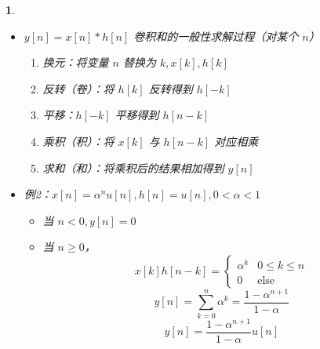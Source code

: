 \documentclass[UTF8]{report}
\theoremstyle{MyLineTheoremStyle} %
\theoremstyle{MyBlockTheoremStyle} %
\theoremstyle{MySubsubsectionStyle} %
\newtheorem{definition}{}
\begin{document}
\begin{definition}
\begin{itemize}
        \item $y[n] = x[n] * h[n]$ 卷积和的一般性求解过程（对某个 $n$）
        \begin{enumerate}
            \item 换元：将变量 $n$ 替换为 $k, x[k], h[k]$
            \item 反转（卷）：将 $h[k]$ 反转得到 $h[-k]$
            \item 平移：$h[-k]$ 平移得到 $h[n - k]$
            \item 乘积（积）：将 $x[k]$ 与 $h[n - k]$ 对应相乘
            \item 求和（和）：将乘积后的结果相加得到 $y[n]$
        \end{enumerate}

        \item 例2：$x[n] = \alpha^n u[n], h[n] = u[n], 0 < \alpha < 1$
        \begin{itemize}
            \item 当 $n < 0, y[n] = 0$
            \item 当 $n \geq 0$，
            \[
            x[k] h[n - k] = \begin{cases} 
            \alpha^k & 0 \leq k \leq n \\
            0 & \text{else} 
            \end{cases}
            \]
            \[
            y[n] = \sum_{k=0}^{n} \alpha^k = \frac{1 - \alpha^{n+1}}{1 - \alpha}
            \]
            \[
            y[n] = \frac{1 - \alpha^{n+1}}{1 - \alpha} u[n]
            \]
        \end{itemize}


\end{itemize}
\end{definition}
\end{document}
